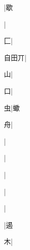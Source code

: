 \begin{multicols}{2}
{{\cjk{}{\cnsym{}　}{\cnsym{}　}{\cnsym{}　}}|{\cjk{}歇}\par
{}|{}\par
{\cjk{}{\cnsym{}　}{\cnsym{}　}匚}|{}\par
{\cjk{}自田丌}|{}\par
{\cjk{}{\cnsym{}　}{\cnsym{}　}山}|{}\par
{\cjk{}{\cnsym{}　}{\cnsym{}　}口}|{}\par
{\cjk{}{\cnsym{}　}{\cnsym{}　}虫}|{\cjk{}蠍}\par
{\cjk{}{\cnsym{}　}{\cnsym{}　}舟}|{}\par
{}|{}\par
{}|{}\par
{}|{}\par
{}|{}\par
{\cjk{}{\cnsym{}　}{\cnsym{}　}{\cnsym{}　}}|{}\par
{\cjk{}{\cnsym{}　}{\cnsym{}　}{\cnsym{}　}}|{\cjk{}遏}\par
{\cjk{}{\cnsym{}　}{\cnsym{}　}木}|{}\par
}
\end{multicols}
